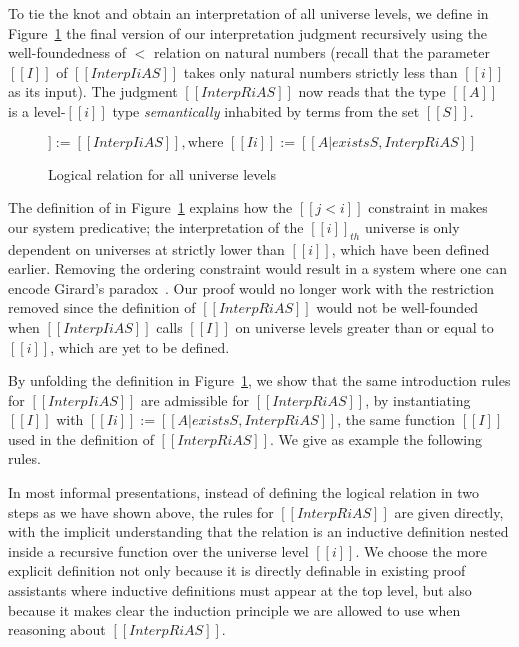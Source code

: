 \documentclass[acmsmall,screen=true,
\ifpublic review=false\else,review=true\fi
  ,anonymous=\ifanonymous true\else false\fi]{acmart}
\begin{document}
To tie the knot and obtain an interpretation of all universe levels,
we define in Figure~\ref{fig:logrelrec} the final version of our interpretation judgment recursively
using the well-foundedness of $<$ relation on natural
numbers (recall that
the parameter $[[I]]$ of $[[Interp I i A S]]$ takes only natural
numbers strictly less than $[[i]]$ as its input).
The judgment $[[InterpR i A S]]$ now reads that the type $[[A]]$ is a
level-$[[i]]$ type \emph{semantically} inhabited by terms from the set
$[[S]]$.

\begin{figure}[h]
\begin{equation*}
    [[InterpR i A S]] := [[ Interp I i A S  ]], \text{where } [[I i]] := [[{A | exists S , InterpR i A S}]]
\end{equation*}
\caption{Logical relation for all universe levels}
\label{fig:logrelrec}
\end{figure}
The definition of in Figure~\ref{fig:logrelrec} explains how the $[[j
< i]]$ constraint in  makes our system predicative; the
interpretation of the $[[i]]_{th}$ universe is only dependent on
universes at strictly lower than $[[i]]$, which have been defined earlier.
Removing the ordering constraint would result in a
system where one can encode Girard's
paradox~\citep{girard-thesis}. Our proof would no longer work with the
restriction removed since the definition of $[[InterpR i A S]]$ would
not be well-founded when $[[Interp I i A S]]$ calls $[[I]]$ on
universe levels greater than or equal to $[[i]]$, which are yet to be defined.

By unfolding the definition in Figure~\ref{fig:logrelrec}, we
show that the same introduction rules for $[[Interp I i A S]]$ are
admissible for $[[InterpR i A S]]$, by
instantiating $[[I]]$ with $[[I i]] := [[{A | exists S , InterpR i A
  S}]]$, the same function $[[I]]$ used in the definition of $[[InterpR i A
S]]$. We give as example the following rules.
\begin{center}
 \qquad {}
\end{center}

In most informal presentations, instead of defining the logical
relation in two steps as we have shown above, the rules for $[[InterpR
i A S]]$ are given directly, with the implicit understanding that the
relation is an inductive definition nested inside a recursive
function over the universe level $[[i]]$. We choose
the more explicit definition not only because it is directly definable
in existing proof assistants where inductive definitions must appear
at the top level, but also because it makes clear the induction
principle we are allowed to use when reasoning about $[[InterpR i A
S]]$.
\end{document}
